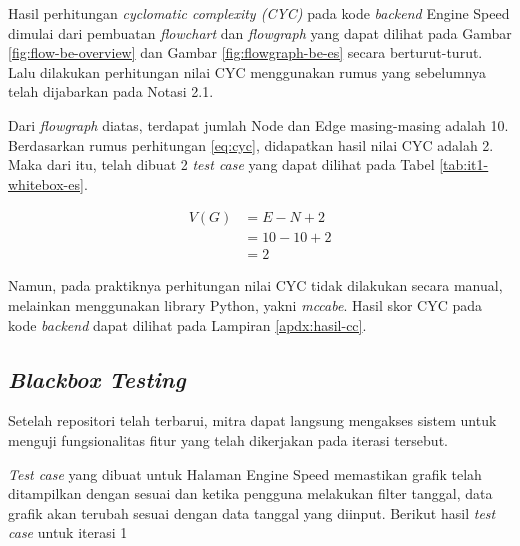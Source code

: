 

Hasil perhitungan \textit{cyclomatic complexity (CYC)} pada kode \textit{backend} Engine Speed dimulai dari pembuatan \textit{flowchart} dan \textit{flowgraph} yang dapat dilihat pada Gambar \ref{fig:flow-be-overview} dan Gambar \ref{fig:flowgraph-be-es} secara berturut-turut. Lalu dilakukan perhitungan nilai CYC menggunakan rumus yang sebelumnya telah dijabarkan pada Notasi 2.1.



Dari \textit{flowgraph} diatas, terdapat jumlah Node dan Edge masing-masing adalah 10. Berdasarkan rumus perhitungan \ref{eq:cyc}, didapatkan hasil nilai CYC adalah 2. Maka dari itu, telah dibuat 2 \textit{test case} yang dapat dilihat pada Tabel \ref{tab:it1-whitebox-es}.

\begin{equation}\label{eq:cyc-es}
    \begin{split}
        V(G) & = E - N + 2 \\
            & = 10 - 10 + 2 \\
            & = 2
    \end{split}
\end{equation}

Namun, pada praktiknya perhitungan nilai CYC tidak dilakukan secara manual, melainkan menggunakan library Python, yakni \textit{mccabe}. Hasil skor CYC pada kode \textit{backend} dapat dilihat pada Lampiran \ref{apdx:hasil-cc}.

\begin{landscape}
    

\end{landscape}



\begin{landscape}

    \subsection{\textit{{Blackbox Testing}}}

    Setelah repositori telah terbarui, mitra dapat langsung mengakses sistem untuk menguji fungsionalitas fitur yang telah dikerjakan pada iterasi tersebut.

    

    \textit{Test case} yang dibuat untuk Halaman Engine Speed memastikan grafik telah ditampilkan dengan sesuai dan ketika pengguna melakukan filter tanggal, data grafik akan terubah sesuai dengan data tanggal yang diinput. Berikut hasil \textit{test case} untuk iterasi 1

    
\end{landscape}

